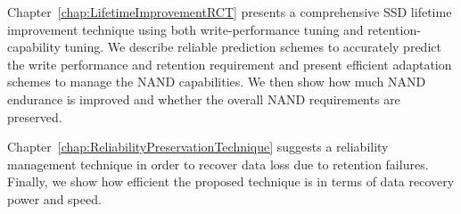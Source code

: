 Chapter~\ref{chap:LifetimeImprovementRCT} presents a comprehensive SSD lifetime improvement technique using both write-performance tuning and retention-capability tuning.
We describe reliable prediction schemes to accurately predict the write performance and retention requirement and present efficient adaptation schemes to manage the NAND capabilities.
We then show how much NAND endurance is improved and whether the overall NAND requirements are preserved.

Chapter~\ref{chap:ReliabilityPreservationTechnique} suggests a reliability management technique in order to recover data loss due to retention failures.
Finally, we show how efficient the proposed technique is in terms of data recovery power and speed.

